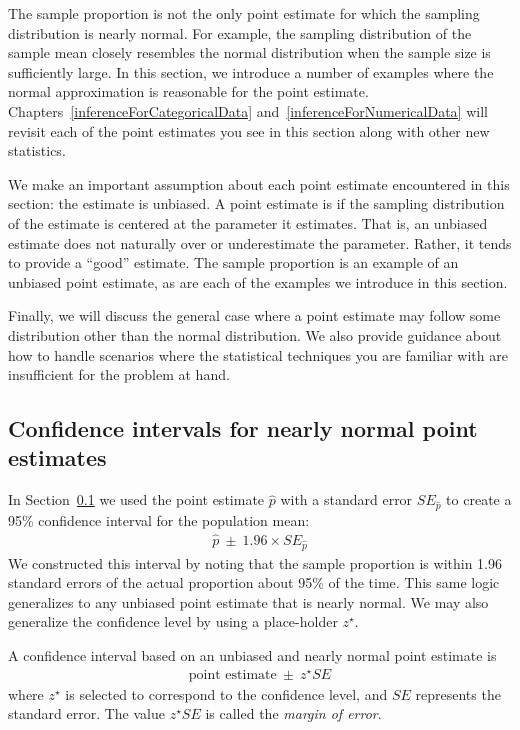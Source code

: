 The sample proportion is not the only point estimate for which the sampling distribution is nearly normal. For example, the sampling distribution of the sample mean closely resembles the normal distribution when the sample size is sufficiently large. In this section, we introduce a number of examples where the normal approximation is reasonable for the point estimate. Chapters~\ref{inferenceForCategoricalData} and~\ref{inferenceForNumericalData} will revisit each of the point estimates you see in this section along with other new statistics.

We make an important assumption about each point estimate encountered in this section: the estimate is unbiased. A point estimate is  if the sampling distribution of the estimate is centered at the parameter it estimates. That is, an unbiased estimate does not naturally over or underestimate the parameter. Rather, it tends to provide a ``good'' estimate. The sample proportion is an example of an unbiased point estimate, as are each of the examples we introduce in this section.

 Finally, we will discuss the general case where a point estimate may follow some distribution other than the normal distribution. We also provide guidance about how to handle scenarios where the statistical techniques you are familiar with are insufficient for the problem at hand.


\subsection{Confidence intervals for nearly normal point estimates}


In Section~\ref{} we used the point estimate $\hat{p}$ with a standard error $SE_{\hat{p}}$ to create a 95\% confidence interval for the population mean:
\begin{align*}
\hat{p}\ \pm\ 1.96 \times SE_{\hat{p}}
\end{align*}
We constructed this interval by noting that the sample proportion is within 1.96 standard errors of the actual proportion about 95\% of the time. This same logic generalizes to any unbiased point estimate that is nearly normal. We may also generalize the confidence level by using a place-holder $z^{\star}$.

\begin{termBox}{\label{generalConfidenceIntervalTermBox}%
A confidence interval based on an unbiased and nearly normal point estimate is
\begin{align*}
\text{point estimate}\ \pm\ z^{\star}SE
\end{align*}
where $z^{\star}$ is selected to correspond to the confidence level, and $SE$ represents the standard error. The value $z^{\star}SE$ is called the \emph{margin of error}.}
\end{termBox}

